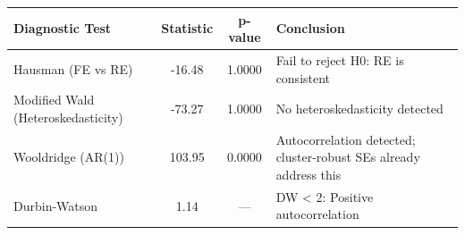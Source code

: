 \begin{tabular}{lccl}
\toprule
Diagnostic Test & Statistic & p-value & Conclusion \\
\midrule
Hausman (FE vs RE) & -16.48 & 1.0000 & Fail to reject H0: RE is consistent \\
Modified Wald (Heteroskedasticity) & -73.27 & 1.0000 & No heteroskedasticity detected \\
Wooldridge (AR(1)) & 103.95 & 0.0000 & Autocorrelation detected; cluster-robust SEs already address this \\
Durbin-Watson & 1.14 & --- & DW < 2: Positive autocorrelation \\
\bottomrule
\end{tabular}